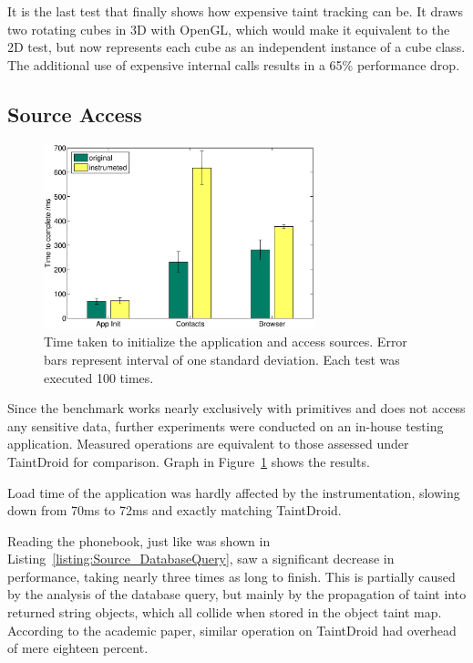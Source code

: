 \documentclass[12pt,twoside,notitlepage]{report}
\begin{document}
It is the last test that finally shows how expensive taint tracking can be. It draws two rotating cubes in 3D with OpenGL, which would make it equivalent to the 2D test, but now represents each cube as an independent instance of a cube class. The additional use of expensive internal calls results in a 65\% performance drop.

\subsection{Source Access}

\begin{figure}
	\centerline{	
		\includegraphics[width=0.7\textwidth]{figs/fig_eval_testappbench.eps}
	}
	\caption{Time taken to initialize the application and access sources. Error bars represent interval of one standard deviation. Each test was executed 100 times.}
	\label{figure:Evalutaion_TestAppBench}
\end{figure}

Since the benchmark works nearly exclusively with primitives and does not access any sensitive data, further experiments were conducted on an in-house testing application. Measured operations are equivalent to those assessed under TaintDroid for comparison. Graph in Figure~\ref{figure:Evalutaion_TestAppBench} shows the results.

Load time of the application was hardly affected by the instrumentation, slowing down from 70ms to 72ms and exactly matching TaintDroid. 

Reading the phonebook, just like was shown in Listing~\ref{listing:Source_DatabaseQuery}, saw a significant decrease in performance, taking nearly three times as long to finish. This is partially caused by the analysis of the database query, but mainly by the propagation of taint into returned string objects, which all collide when stored in the object taint map. According to the academic paper, similar operation on TaintDroid had overhead of mere eighteen percent. 
\end{document}
